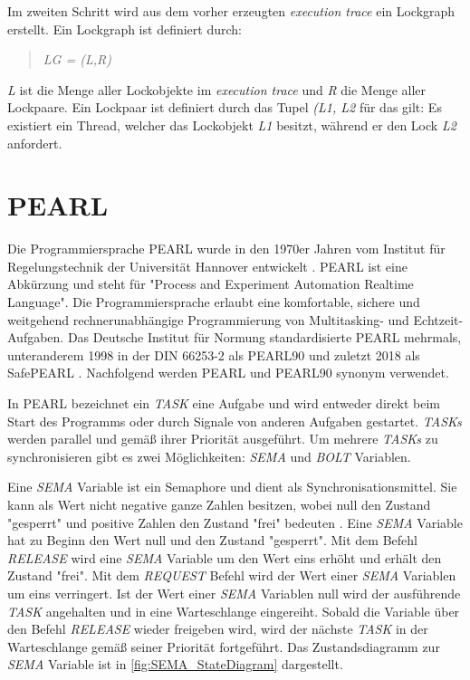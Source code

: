 Im zweiten Schritt wird aus dem vorher erzeugten \textit{execution trace} ein
Lockgraph erstellt. Ein Lockgraph ist definiert durch:
\begin{quote}
\textit{LG = (L,R)}
\end{quote}
\textit{L} ist die Menge aller Lockobjekte im \textit{execution trace} und
\textit{R} die Menge aller Lockpaare. Ein Lockpaar ist definiert durch das Tupel
\textit{(L1, L2} für das gilt: Es existiert ein
Thread, welcher das Lockobjekt \textit{L1} besitzt, während er
den Lock \textit{L2} anfordert.

\section{PEARL}
\label{section:PEARL}
Die Programmiersprache PEARL wurde in den 1970er Jahren vom Institut für Regelungstechnik der Universität Hannover entwickelt \autocite{PEARLHistory}. PEARL ist eine Abkürzung und steht für "Process and Experiment Automation Realtime Language". Die Programmiersprache erlaubt eine komfortable, sichere und weitgehend rechnerunabhängige Programmierung von Multitasking- und Echtzeit-Aufgaben. Das Deutsche Institut für Normung standardisierte PEARL mehrmals, unteranderem 1998 in der DIN 66253-2 als PEARL90 \autocite{DIN-66253-2:1998-04} und zuletzt 2018 als SafePEARL \autocite{DIN-66253:2018-03}. Nachfolgend werden PEARL und PEARL90 synonym verwendet. 

In PEARL bezeichnet ein \textit{TASK} eine Aufgabe und wird entweder direkt beim Start des Programms oder durch Signale von anderen Aufgaben gestartet. \textit{TASKs} werden parallel und gemäß ihrer Priorität ausgeführt. Um mehrere \textit{TASKs} zu synchronisieren gibt es zwei Möglichkeiten: \textit{SEMA} und \textit{BOLT} Variablen. 

Eine \textit{SEMA} Variable ist ein Semaphore und dient als Synchronisationsmittel. Sie kann als Wert nicht negative ganze Zahlen besitzen, wobei null den Zustand "gesperrt" und positive Zahlen den Zustand "frei" bedeuten \autocite[9--17]{PEARL}. Eine \textit{SEMA} Variable hat zu Beginn den Wert null und den Zustand "gesperrt". Mit dem Befehl \textit{RELEASE} wird eine \textit{SEMA} Variable um den Wert eins erhöht und erhält den Zustand "frei". Mit dem \textit{REQUEST} Befehl wird der Wert einer \textit{SEMA} Variablen um eins verringert. Ist der Wert einer \textit{SEMA} Variablen null wird der ausführende \textit{TASK} angehalten und in eine Warteschlange eingereiht. Sobald die Variable über den Befehl \textit{RELEASE} wieder freigeben wird, wird der nächste \textit{TASK} in der Warteschlange gemäß seiner Priorität fortgeführt. Das Zustandsdiagramm zur \textit{SEMA} Variable ist in \cref{fig:SEMA_StateDiagram} dargestellt.

